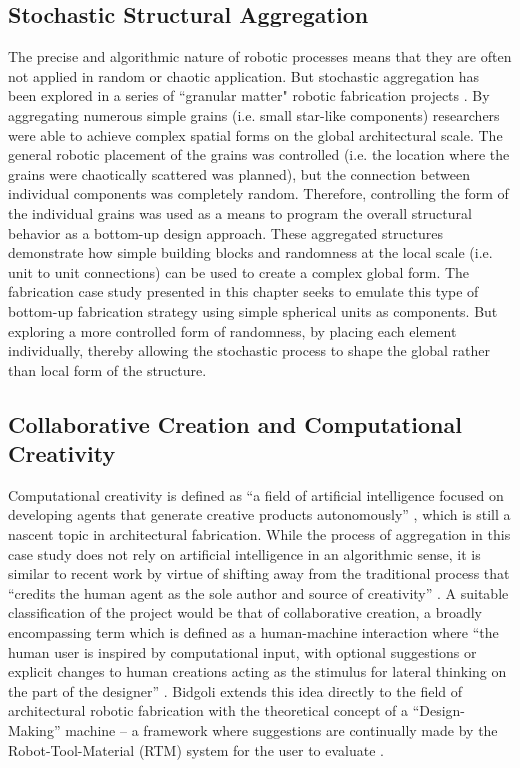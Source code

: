     \subsection{Stochastic Structural Aggregation} \label{sec:robo2}
        The precise and algorithmic nature of robotic processes means that they are often not applied in random or chaotic application. But stochastic aggregation has been explored in a series of ``granular matter" robotic fabrication projects \citep{dierichs_towards_2016, dierichs_construction_2019}. By aggregating numerous simple grains (i.e. small star-like components) researchers were able to achieve complex spatial forms on the global architectural scale. The general robotic placement of the grains was controlled (i.e. the location where the grains were chaotically scattered was planned), but the connection between individual components was completely random. Therefore, controlling the form of the individual grains was used as a means to program the overall structural behavior as a bottom-up design approach. These aggregated structures demonstrate how simple building blocks and randomness at the local scale (i.e. unit to unit connections) can be used to create a complex global form. The fabrication case study presented in this chapter seeks to emulate this type of bottom-up fabrication strategy using simple spherical units as components. But exploring a more controlled form of randomness, by placing each element individually, thereby allowing the stochastic process to shape the global rather than local form of the structure.

    \subsection{Collaborative Creation and Computational Creativity} \label{sec:robo3}
        Computational creativity is defined as ``a field of artificial intelligence focused on developing agents that generate creative products autonomously'' \citep{davis_empirically_2016}, which is still a nascent topic in architectural fabrication. While the process of aggregation in this case study does not rely on artificial intelligence in an algorithmic sense, it is similar to recent work \citep{bidgoli_deepcloud_2018, barque-duran_my_2018, akten_learning_2017} by virtue of shifting away from the traditional process that ``credits the human agent as the sole author and source of creativity'' \citep{bidgoli_machinic_2019}. A suitable classification of the project would be that of collaborative creation, a broadly encompassing term which is defined as a human-machine interaction where ``the human user is inspired by computational input, with optional suggestions or explicit changes to human creations acting as the stimulus for lateral thinking on the part of the designer'' \citep{liapis_can_2016}. Bidgoli extends this idea directly to the field of architectural robotic fabrication with the theoretical concept of a ``Design-Making'' machine -- a framework where suggestions are continually made by the Robot-Tool-Material (RTM) system for the user to evaluate \citep{bidgoli_towards_2016}.
        

